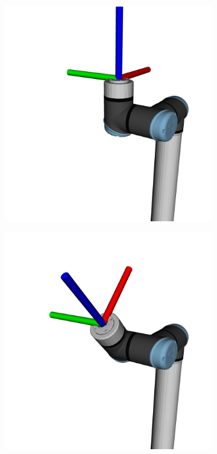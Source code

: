 \begin{figure}[h]
    \centering
    \begin{subfigure}{.2\linewidth}
      \centering
      \includegraphics[width=\linewidth]{figs/chp3/P1.png}
      \label{fig:eef_p1}
    \end{subfigure}%
    \begin{subfigure}{.2\linewidth}
      \centering
      \includegraphics[width=\linewidth]{figs/chp3/P2.png}

\end{subfigure}
\end{figure}
